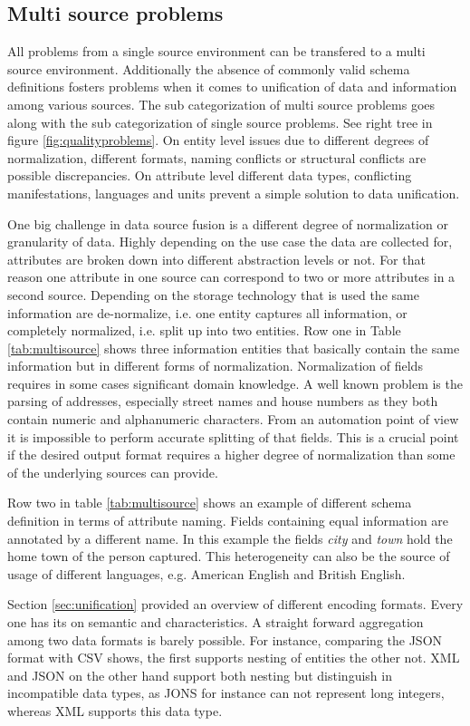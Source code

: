 \subsection{Multi source problems}
All problems from a single source environment can be transfered to a multi source environment. Additionally the absence of commonly valid schema definitions fosters problems when it comes to unification of data and information among various sources. The sub categorization of multi source problems goes along with the sub categorization of single source problems. See right tree in figure \ref{fig:qualityproblems}. On entity level issues due to different degrees of normalization, different formats, naming conflicts or structural conflicts are possible discrepancies. On attribute level different data types, conflicting manifestations, languages and units prevent a simple solution to data unification.

One big challenge in data source fusion is a different degree of normalization or granularity of data. Highly depending on the use case the data are collected for, attributes are broken down into different abstraction levels or not. For that reason one attribute in one source can correspond to two or more attributes in a second source. Depending on the storage technology that is used the same information are de-normalize, i.e. one entity captures all information, or completely normalized, i.e. split up into two entities. Row one in Table \ref{tab:multisource} shows three information entities that basically contain the same information but in different forms of normalization. Normalization of fields requires in some cases significant domain knowledge. A well known problem is the parsing of addresses, especially street names and house numbers as they both contain numeric and alphanumeric characters. From an automation point of view it is impossible to perform accurate splitting of that fields. This is a crucial point if the desired output format requires a higher degree of normalization than some of the underlying sources can provide. 

Row two in table \ref{tab:multisource} shows an example of different schema definition in terms of attribute naming. Fields containing equal information are annotated by a different name. In this example the fields \textit{city} and \textit{town} hold the home town of the person captured. This heterogeneity can also be the source of usage of different languages, e.g. American English and British English. 

Section \ref{sec:unification} provided an overview of different encoding formats. Every one has its on semantic and characteristics. A straight forward aggregation among two data formats is barely possible. For instance, comparing the JSON\cite{json_2017} format with CSV shows, the first supports nesting of entities the other not. XML\cite{xml_2017} and JSON on the other hand support both nesting but distinguish in incompatible data types, as JONS for instance can not represent long integers, whereas XML supports this data type.

